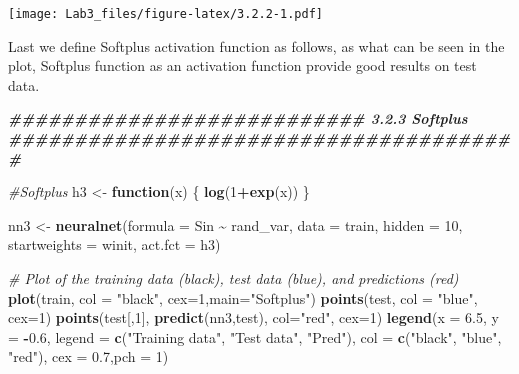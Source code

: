 \documentclass[
]{article}
\newenvironment{Shaded}{\begin{snugshade}}{\end{snugshade}}
\newcommand{\AttributeTok}[1]{\textcolor[rgb]{0.13,0.29,0.53}{#1}}
\newcommand{\CommentTok}[1]{\textcolor[rgb]{0.56,0.35,0.01}{\textit{#1}}}
\newcommand{\ControlFlowTok}[1]{\textcolor[rgb]{0.13,0.29,0.53}{\textbf{#1}}}
\newcommand{\DecValTok}[1]{\textcolor[rgb]{0.00,0.00,0.81}{#1}}
\newcommand{\DocumentationTok}[1]{\textcolor[rgb]{0.56,0.35,0.01}{\textbf{\textit{#1}}}}
\newcommand{\FloatTok}[1]{\textcolor[rgb]{0.00,0.00,0.81}{#1}}
\newcommand{\FunctionTok}[1]{\textcolor[rgb]{0.13,0.29,0.53}{\textbf{#1}}}
\newcommand{\NormalTok}[1]{#1}
\newcommand{\OtherTok}[1]{\textcolor[rgb]{0.56,0.35,0.01}{#1}}
\newcommand{\SpecialCharTok}[1]{\textcolor[rgb]{0.81,0.36,0.00}{\textbf{#1}}}
\newcommand{\StringTok}[1]{\textcolor[rgb]{0.31,0.60,0.02}{#1}}
\begin{document}
\texttt{[image: Lab3\_files/figure-latex/3.2.2-1.pdf]}

Last we define Softplus activation function as follows, as what can be
seen in the plot, Softplus function as an activation function provide
good results on test data.

\begin{Shaded}
\begin{Highlighting}[]
\DocumentationTok{\#\#\#\#\#\#\#\#\#\#\#\#\#\#\#\#\#\#\#\#\#\#\#\#\#\#\#  3.2.3 Softplus \#\#\#\#\#\#\#\#\#\#\#\#\#\#\#\#\#\#\#\#\#\#\#\#\#\#\#\#\#\#\#\#\#\#\#\#\#\#\#}

\CommentTok{\#Softplus}
\NormalTok{h3 }\OtherTok{\textless{}{-}} \ControlFlowTok{function}\NormalTok{(x) \{}
  \FunctionTok{log}\NormalTok{(}\DecValTok{1}\SpecialCharTok{+}\FunctionTok{exp}\NormalTok{(x))}
\NormalTok{\}}

\NormalTok{nn3 }\OtherTok{\textless{}{-}} \FunctionTok{neuralnet}\NormalTok{(}\AttributeTok{formula =}\NormalTok{ Sin }\SpecialCharTok{\textasciitilde{}}\NormalTok{ rand\_var, }\AttributeTok{data =}\NormalTok{ train, }\AttributeTok{hidden =} \DecValTok{10}\NormalTok{,}
\AttributeTok{startweights =}\NormalTok{ winit, }\AttributeTok{act.fct =}\NormalTok{ h3)}

\CommentTok{\# Plot of the training data (black), test data (blue), and predictions (red)}
\FunctionTok{plot}\NormalTok{(train,  }\AttributeTok{col =} \StringTok{"black"}\NormalTok{, }\AttributeTok{cex=}\DecValTok{1}\NormalTok{,}\AttributeTok{main=}\StringTok{"Softplus"}\NormalTok{)}
\FunctionTok{points}\NormalTok{(test, }\AttributeTok{col =} \StringTok{"blue"}\NormalTok{, }\AttributeTok{cex=}\DecValTok{1}\NormalTok{)}
\FunctionTok{points}\NormalTok{(test[,}\DecValTok{1}\NormalTok{], }\FunctionTok{predict}\NormalTok{(nn3,test), }\AttributeTok{col=}\StringTok{"red"}\NormalTok{, }\AttributeTok{cex=}\DecValTok{1}\NormalTok{)}
\FunctionTok{legend}\NormalTok{(}\AttributeTok{x =} \FloatTok{6.5}\NormalTok{, }\AttributeTok{y =} \SpecialCharTok{{-}}\FloatTok{0.6}\NormalTok{, }\AttributeTok{legend =} \FunctionTok{c}\NormalTok{(}\StringTok{"Training data"}\NormalTok{, }\StringTok{"Test data"}\NormalTok{,}
\StringTok{"Pred"}\NormalTok{), }\AttributeTok{col =} \FunctionTok{c}\NormalTok{(}\StringTok{"black"}\NormalTok{, }\StringTok{"blue"}\NormalTok{, }\StringTok{"red"}\NormalTok{), }\AttributeTok{cex =} \FloatTok{0.7}\NormalTok{,}\AttributeTok{pch =} \DecValTok{1}\NormalTok{)}
\end{Highlighting}
\end{Shaded}
\end{document}
